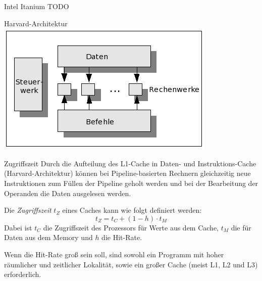 \begin{example}[Cachehierarchie]{Intel Itanium}
    TODO
\end{example}

\begin{example}[Cachehierarchie]{Harvard-Architektur}
    \includegraphics[width=\textwidth]{images/harvard_architektur.png}
\end{example}

\begin{defi}[Cache]{Zugriffszeit}
    Durch die Aufteilung des L1-Cache in Daten- und Instruktions-Cache (Harvard-Architektur) können bei Pipeline-basierten Rechnern gleichzeitig neue Instruktionen zum Füllen der Pipeline geholt werden und bei der Bearbeitung der Operanden die Daten ausgelesen werden.
    
    Die \emph{Zugriffszeit} $t_Z$ eines Caches kann wie folgt definiert werden:
    \[
        t_Z = t_{C} + (1 - h) \cdot t_{M}
    \]
    Dabei ist $t_C$ die Zugriffszeit des Prozessors für Werte aus dem Cache, $t_M$ die für Daten aus dem Memory und $h$ die Hit-Rate.
    
    Wenn die Hit-Rate groß sein soll, sind sowohl ein Programm mit hoher räumlicher und zeitlicher Lokalität, sowie ein großer Cache (meist L1, L2 und L3) erforderlich.
\end{defi}

